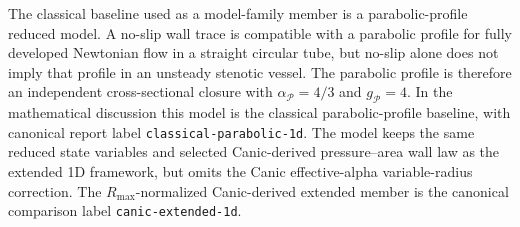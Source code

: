 \begin{definition}
    \label{def:classical-no-slip-1d-baseline}
    The classical baseline used as a model-family member is a
    parabolic-profile reduced model. A no-slip wall trace is compatible with a
    parabolic profile for fully developed Newtonian flow in a straight circular
    tube, but no-slip alone does not imply that profile in an unsteady stenotic
    vessel. The parabolic profile is therefore an independent cross-sectional
    closure with $\alpha_{\mathcal P}=4/3$ and $g_{\mathcal P}=4$. In the
    mathematical discussion this model is the classical parabolic-profile
    baseline, with canonical report label \texttt{classical-parabolic-1d}.
    The model keeps the same reduced state variables and selected
    Canic-derived pressure--area wall law as the extended 1D framework, but
    omits the Canic effective-alpha variable-radius correction. The
    $R_{\max}$-normalized Canic-derived extended member is the canonical
    comparison label \texttt{canic-extended-1d}.
\end{definition}

